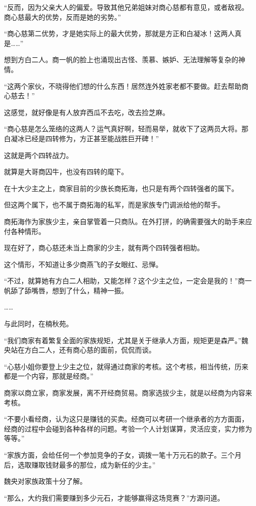 \begin{this_body}
“反而，因为父亲大人的偏爱。导致其他兄弟姐妹对商心慈都有意见，或者敌视。商心慈最大的优势，反而是她的劣势。”

“商心慈第二优势，才是她实际上的最大优势，那就是方正和白凝冰！这两人真是……”

想到方白二人。商一帆的脸上也涌现出古怪、羡慕、嫉妒、无法理解等复杂的神情。

“这两个家伙，不晓得他们想的什么东西！居然连外姓家老都不要做。赶去帮助商心慈去！”

这感觉，就好像是有人放弃西瓜不去吃，改去捡芝麻。

“商心慈是怎么笼络的这两人？运气真好啊，轻而易举，就收下了这两员大将。那白凝冰已经是四转修为，方正甚至能战胜巨开碑！”

这就是两个四转战力。

就算是大哥商囚牛，也没有四转的麾下。

在十大少主之上，商家目前的少族长商拓海，也只是有两个四转强者的属下。

但这两个属下，也不属于商拓海的私军，而是家族专门调派给他的帮手。

商拓海作为家族少主，亲自掌管着一只商队。在外打拼，的确需要强大的助手来应付各种情形。

现在好了，商心慈还未当上商家的少主，就有两个四转强者相助。

这个情形，不知道让多少商燕飞的子女眼红、忌惮。

“不过，就算她有方白二人相助，又能怎样？这个少主之位，一定会是我的！”商一帆舔了舔嘴唇，想到了什么，精神一振。

……

与此同时，在楠秋苑。

“我们商家有着繁复全面的家族规矩，尤其是关于继承人方面，规矩更是森严。”魏央站在方白二人，还有商心慈的面前，侃侃而谈。

“心慈小姐你要登上少主之位，就得通过商家的考核。这个考核，相当传统，历来都是一个内容，那就是经商。”

商家以商立家，商家发展，离不开经商贸易。商家选拔少主，就是以经商为内容来考核。

“不要小看经商，认为这只是赚钱的买卖。经商可以考研一个继承者的方方面面，经商的过程中会碰到各种各样的问题。考验一个人计划谋算，灵活应变，实力修为等等。”

“家族方面，会给任何一个参加竞争的子女，调拨一笔十万元石的款子。三个月后，选取赚取钱财最多的那位，成为新任的少主。”

魏央对家族政策十分了解。

“那么，大约我们需要赚到多少元石，才能够赢得这场竞赛？”方源问道。


\end{this_body}
